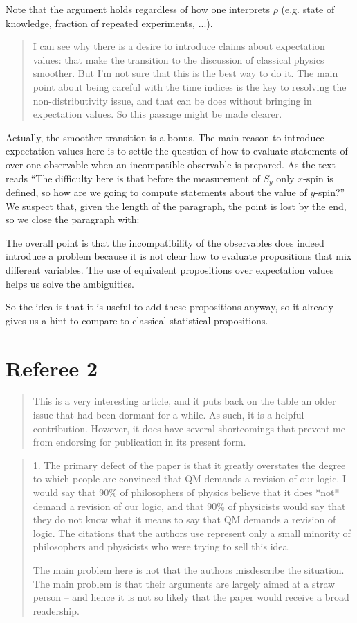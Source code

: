 \documentclass[11pt]{article}
\newcommand\change[1]{{\color{red!75!black} #1}}
\begin{document}
Note that the argument holds regardless of how one interprets $\rho$ (e.g. state of knowledge, fraction of repeated experiments, ...).

\begin{quote}
I can see why there is a desire to introduce claims about expectation values: that make the transition to the discussion of classical physics smoother. But I'm not sure that this is the best way to do it. The main point about being careful with the time indices is the key to resolving the non-distributivity issue, and that can be does without bringing in expectation values. So this passage might be made clearer.
\end{quote}
Actually, the smoother transition is a bonus. The main reason to introduce expectation values here is to settle the question of how to evaluate statements of over one observable when an incompatible observable is prepared. As the text reads ``The difficulty here is that before the measurement of $S_y$ only $x$-spin is defined, so how are we going to compute statements about the value of $y$-spin?'' We suspect that, given the length of the paragraph, the point is lost by the end, so we close the paragraph with:

\change{The overall point is that the incompatibility of the observables does indeed introduce a problem because it is not clear how to evaluate propositions that mix different variables. The use of equivalent propositions over expectation values helps us solve the ambiguities.}

So the idea is that it is useful to add these propositions anyway, so it already gives us a hint to compare to classical statistical propositions.

\section*{Referee 2}

\begin{quote}
This is a very interesting article, and it puts back on the table an older issue that had been dormant for a while. As such, it is a helpful contribution. However, it does have several shortcomings that prevent me from endorsing for publication in its present form. 
\end{quote}

\begin{quote}
1. The primary defect of the paper is that it greatly overstates the degree to which people are convinced that QM demands a revision of our logic. I would say that 90\% of philosophers of physics believe that it does *not* demand a revision of our logic, and that 90\% of physicists would say that they do not know what it means to say that QM demands a revision of logic. The citations that the authors use represent only a small minority of philosophers and physicists who were trying to sell this idea. 

The main problem here is not that the authors misdescribe the situation. The main problem is that their arguments are largely aimed at a straw person -- and hence it is not so likely that the paper would receive a broad readership. 
\end{quote}
\end{document}
